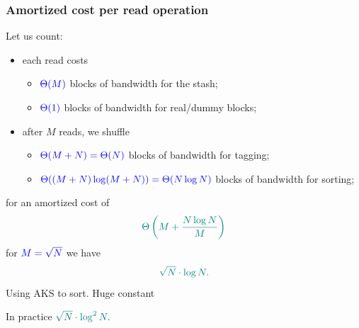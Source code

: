 \documentclass[]{beamer}
\newcommand{\manager}{\mathcal{M}}
\newcommand{\cnt}{\mathsf{cnt}}
\newcommand{\nxt}{\mathsf{nxt}}
\begin{document}
{\begin{frame}

\end{frame}
\begin{frame}
\frametitle{Amortized cost per read operation}
Let us count:
\pause
\begin{itemize}[<+->]
\item each read costs
    \begin{itemize}
        \item $\color{blue} \Theta(M)$ blocks of bandwidth for the stash;
        \item $\color{blue} \Theta(1)$ blocks of bandwidth for real/dummy blocks;
    \end{itemize}
\item after $M$ reads, we shuffle
    \begin{itemize}
        \item $\color{blue} \Theta(M+N)=\Theta(N)$ blocks of bandwidth for tagging;
        \item $\color{blue} \Theta((M+N)\log (M+N))=\Theta(N\log N)$ blocks of bandwidth for sorting;
    \end{itemize}
\end{itemize}
\pause
for an amortized cost of 
$$\color{teal} \Theta\left(M+\frac{N\log N}{M}\right)$$ 
\pause
for $\color{blue} M=\sqrt{N}$ we have 
$$\color{teal} \sqrt{N}\cdot\log N.$$
\pause
Using AKS to sort. 
\pause
\hfill
{\color{brown} Huge constant}
\pause

In practice 
$\color{teal} \sqrt{N}\cdot\log^2 N.$
\end{frame}
}
\end{document}
